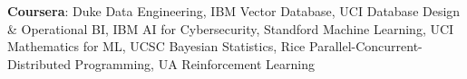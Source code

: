\textbf{Coursera}: Duke Data Engineering, IBM Vector Database, UCI Database Design \& Operational BI, IBM AI for Cybersecurity, Standford Machine Learning, UCI Mathematics for ML, UCSC Bayesian Statistics, Rice Parallel-Concurrent-Distributed Programming, UA Reinforcement Learning   